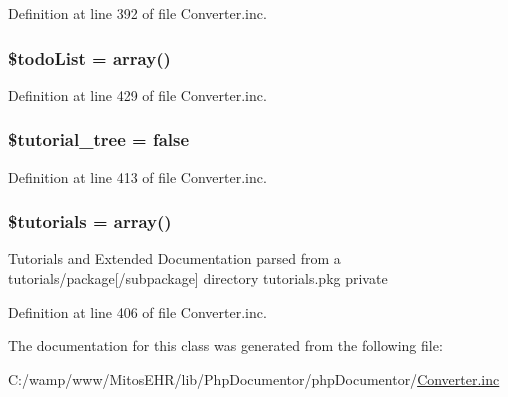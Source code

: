 \-Definition at line 392 of file \-Converter.\-inc.

\hypertarget{class_converter_a007be5d771c8611589ff85f6d795d408}{
\subsubsection[{\$todo\-List}]{\setlength{\rightskip}{0pt plus 5cm}\$todo\-List = array()}}\label{class_converter_a007be5d771c8611589ff85f6d795d408}


\-Definition at line 429 of file \-Converter.\-inc.

\hypertarget{class_converter_a600397e42df2a02557437cf901638370}{
\subsubsection[{\$tutorial\-\_\-tree}]{\setlength{\rightskip}{0pt plus 5cm}\$tutorial\-\_\-tree = false}}\label{class_converter_a600397e42df2a02557437cf901638370}


\-Definition at line 413 of file \-Converter.\-inc.

\hypertarget{class_converter_a0a2a671833630e9d417f84cbb2b1eff1}{
\subsubsection[{\$tutorials}]{\setlength{\rightskip}{0pt plus 5cm}\$tutorials = array()}}\label{class_converter_a0a2a671833630e9d417f84cbb2b1eff1}
\-Tutorials and \-Extended \-Documentation parsed from a tutorials/package\mbox{[}/subpackage\mbox{]} directory  tutorials.\-pkg  private 

\-Definition at line 406 of file \-Converter.\-inc.



\-The documentation for this class was generated from the following file\-:\begin{DoxyCompactItemize}
\item 
\-C\-:/wamp/www/\-Mitos\-E\-H\-R/lib/\-Php\-Documentor/php\-Documentor/\hyperlink{_converter_8inc}{\-Converter.\-inc}\end{DoxyCompactItemize}
